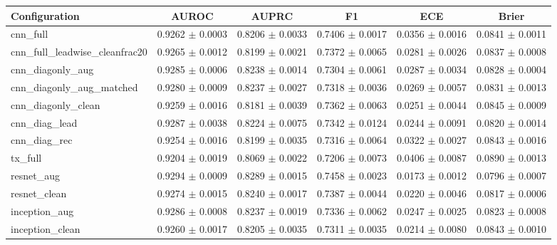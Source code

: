 \begin{tabular}{lccccc}
\toprule
Configuration & AUROC & AUPRC & F1 & ECE & Brier \\
\midrule
cnn\_full & 0.9262 $\pm$ 0.0003 & 0.8206 $\pm$ 0.0033 & 0.7406 $\pm$ 0.0017 & 0.0356 $\pm$ 0.0016 & 0.0841 $\pm$ 0.0011 \\
cnn\_full\_leadwise\_cleanfrac20 & 0.9265 $\pm$ 0.0012 & 0.8199 $\pm$ 0.0021 & 0.7372 $\pm$ 0.0065 & 0.0281 $\pm$ 0.0026 & 0.0837 $\pm$ 0.0008 \\
cnn\_diagonly\_aug & 0.9285 $\pm$ 0.0006 & 0.8238 $\pm$ 0.0014 & 0.7304 $\pm$ 0.0061 & 0.0287 $\pm$ 0.0034 & 0.0828 $\pm$ 0.0004 \\
cnn\_diagonly\_aug\_matched & 0.9280 $\pm$ 0.0009 & 0.8237 $\pm$ 0.0027 & 0.7318 $\pm$ 0.0036 & 0.0269 $\pm$ 0.0057 & 0.0831 $\pm$ 0.0013 \\
cnn\_diagonly\_clean & 0.9259 $\pm$ 0.0016 & 0.8181 $\pm$ 0.0039 & 0.7362 $\pm$ 0.0063 & 0.0251 $\pm$ 0.0044 & 0.0845 $\pm$ 0.0009 \\
cnn\_diag\_lead & 0.9287 $\pm$ 0.0038 & 0.8224 $\pm$ 0.0075 & 0.7342 $\pm$ 0.0124 & 0.0244 $\pm$ 0.0091 & 0.0820 $\pm$ 0.0014 \\
cnn\_diag\_rec & 0.9254 $\pm$ 0.0016 & 0.8199 $\pm$ 0.0035 & 0.7316 $\pm$ 0.0064 & 0.0322 $\pm$ 0.0027 & 0.0843 $\pm$ 0.0016 \\
tx\_full & 0.9204 $\pm$ 0.0019 & 0.8069 $\pm$ 0.0022 & 0.7206 $\pm$ 0.0073 & 0.0406 $\pm$ 0.0087 & 0.0890 $\pm$ 0.0013 \\
resnet\_aug & 0.9294 $\pm$ 0.0009 & 0.8289 $\pm$ 0.0015 & 0.7458 $\pm$ 0.0023 & 0.0173 $\pm$ 0.0012 & 0.0796 $\pm$ 0.0007 \\
resnet\_clean & 0.9274 $\pm$ 0.0015 & 0.8240 $\pm$ 0.0017 & 0.7387 $\pm$ 0.0044 & 0.0220 $\pm$ 0.0046 & 0.0817 $\pm$ 0.0006 \\
inception\_aug & 0.9286 $\pm$ 0.0008 & 0.8237 $\pm$ 0.0019 & 0.7336 $\pm$ 0.0062 & 0.0247 $\pm$ 0.0025 & 0.0823 $\pm$ 0.0008 \\
inception\_clean & 0.9260 $\pm$ 0.0017 & 0.8205 $\pm$ 0.0035 & 0.7311 $\pm$ 0.0035 & 0.0214 $\pm$ 0.0080 & 0.0843 $\pm$ 0.0010 \\
\bottomrule
\end{tabular}
